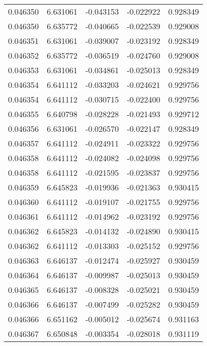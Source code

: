 \begin{tabular}{lrrrr}
0.046350    &  6.631061 & -0.043153 & -0.022922 &             0.928349 \\
0.046350    &  6.635772 & -0.040665 & -0.022539 &             0.929008 \\
0.046351    &  6.631061 & -0.039007 & -0.023192 &             0.928349 \\
0.046352    &  6.635772 & -0.036519 & -0.024760 &             0.929008 \\
0.046353    &  6.631061 & -0.034861 & -0.025013 &             0.928349 \\
0.046354    &  6.641112 & -0.033203 & -0.024621 &             0.929756 \\
0.046354    &  6.641112 & -0.030715 & -0.022400 &             0.929756 \\
0.046355    &  6.640798 & -0.028228 & -0.021493 &             0.929712 \\
0.046356    &  6.631061 & -0.026570 & -0.022147 &             0.928349 \\
0.046357    &  6.641112 & -0.024911 & -0.023322 &             0.929756 \\
0.046358    &  6.641112 & -0.024082 & -0.024098 &             0.929756 \\
0.046358    &  6.641112 & -0.021595 & -0.023837 &             0.929756 \\
0.046359    &  6.645823 & -0.019936 & -0.021363 &             0.930415 \\
0.046360    &  6.641112 & -0.019107 & -0.021755 &             0.929756 \\
0.046361    &  6.641112 & -0.014962 & -0.023192 &             0.929756 \\
0.046362    &  6.645823 & -0.014132 & -0.024890 &             0.930415 \\
0.046362    &  6.641112 & -0.013303 & -0.025152 &             0.929756 \\
0.046363    &  6.646137 & -0.012474 & -0.025927 &             0.930459 \\
0.046364    &  6.646137 & -0.009987 & -0.025013 &             0.930459 \\
0.046365    &  6.646137 & -0.008328 & -0.025021 &             0.930459 \\
0.046366    &  6.646137 & -0.007499 & -0.025282 &             0.930459 \\
0.046366    &  6.651162 & -0.005012 & -0.025674 &             0.931163 \\
0.046367    &  6.650848 & -0.003354 & -0.028018 &             0.931119 \\

\end{tabular}
